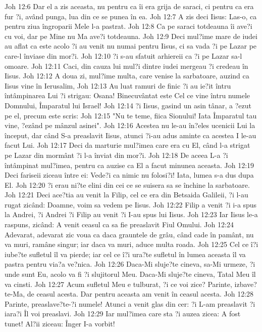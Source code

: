 Joh 12:6  Dar el a zis aceasta, nu pentru ca îi era grija de saraci, ci pentru ca era fur ?i, având punga, lua din ce se punea în ea.
Joh 12:7  A zis deci Iisus: Las-o, ca pentru ziua îngroparii Mele l-a pastrat.
Joh 12:8  Ca pe saraci totdeauna îi ave?i cu voi, dar pe Mine nu Ma ave?i totdeauna.
Joh 12:9  Deci mul?ime mare de iudei au aflat ca este acolo ?i au venit nu numai pentru Iisus, ci sa vada ?i pe Lazar pe care-l înviase din mor?i.
Joh 12:10  ?i s-au sfatuit arhiereii ca ?i pe Lazar sa-l omoare.
Joh 12:11  Caci, din cauza lui mul?i dintre iudei mergeau ?i credeau în Iisus.
Joh 12:12  A doua zi, mul?ime multa, care venise la sarbatoare, auzind ca Iisus vine în Ierusalim,
Joh 12:13  Au luat ramuri de finic ?i au ie?it întru întâmpinarea Lui ?i strigau: Osana! Binecuvântat este Cel ce vine întru numele Domnului, Împaratul lui Israel!
Joh 12:14  ?i Iisus, gasind un asin tânar, a ?ezut pe el, precum este scris:
Joh 12:15  "Nu te teme, fiica Sionului! Iata Împaratul tau vine, ?ezând pe mânzul asinei".
Joh 12:16  Acestea nu le-au în?eles ucenicii Lui la început, dar când S-a preaslavit Iisus, atunci ?i-au adus aminte ca acestea I le-au facut Lui.
Joh 12:17  Deci da marturie mul?imea care era cu El, când l-a strigat pe Lazar din mormânt ?i l-a înviat din mor?i.
Joh 12:18  De aceea L-a ?i întâmpinat mul?imea, pentru ca auzise ca El a facut minunea aceasta.
Joh 12:19  Deci fariseii ziceau între ei: Vede?i ca nimic nu folosi?i! Iata, lumea s-a dus dupa El.
Joh 12:20  ?i erau ni?te elini din cei ce se suisera sa se închine la sarbatoare.
Joh 12:21  Deci ace?tia au venit la Filip, cel ce era din Betsaida Galileii, ?i l-au rugat zicând: Doamne, voim sa vedem pe Iisus.
Joh 12:22  Filip a venit ?i i-a spus la Andrei, ?i Andrei ?i Filip au venit ?i I-au spus lui Iisus.
Joh 12:23  Iar Iisus le-a raspuns, zicând: A venit ceasul ca sa fie preaslavit Fiul Omului.
Joh 12:24  Adevarat, adevarat zic voua ca daca grauntele de grâu, când cade în pamânt, nu va muri, ramâne singur; iar daca va muri, aduce multa roada.
Joh 12:25  Cel ce î?i iube?te sufletul îl va pierde; iar cel ce î?i ura?te sufletul în lumea aceasta îl va pastra pentru via?a ve?nica.
Joh 12:26  Daca-Mi sluje?te cineva, sa-Mi urmeze, ?i unde sunt Eu, acolo va fi ?i slujitorul Meu. Daca-Mi sluje?te cineva, Tatal Meu îl va cinsti.
Joh 12:27  Acum sufletul Meu e tulburat, ?i ce voi zice? Parinte, izbave?te-Ma, de ceasul acesta. Dar pentru aceasta am venit în ceasul acesta.
Joh 12:28  Parinte, preaslave?te-?i numele! Atunci a venit glas din cer: ?i L-am preaslavit ?i iara?i Îl voi preaslavi.
Joh 12:29  Iar mul?imea care sta ?i auzea zicea: A fost tunet! Al?ii ziceau: Înger I-a vorbit!
